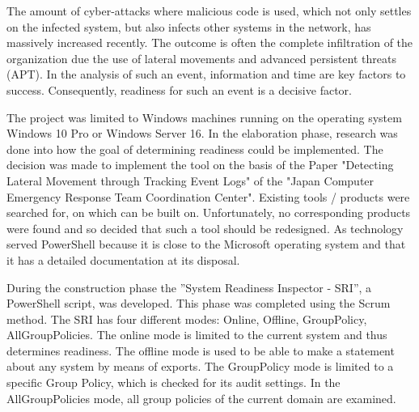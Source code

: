 
\thispagestyle{plain}
\renewcommand\section{\stdsection}
The amount of cyber-attacks where malicious code is used, which not only settles on the infected system, but also infects other systems in the network, has massively increased recently. The outcome is often the complete infiltration of the organization due the use of lateral movements and advanced persistent threats (APT). In the analysis of such an event, information and time are key factors to success. Consequently, readiness for such an event is a decisive factor.

The project was limited to Windows machines running on the operating system Windows 10 Pro or Windows Server 16. In the elaboration phase, research was done into how the goal of determining readiness could be implemented. The decision was made to implement the tool on the basis of the Paper "Detecting Lateral Movement through Tracking Event Logs" of the "Japan Computer Emergency Response Team Coordination Center". Existing tools / products were searched for, on which can be built on. Unfortunately, no corresponding products were found and so decided that such a tool should be redesigned. As technology served PowerShell because it is close to the Microsoft operating system and that it has a detailed documentation at its disposal.

During the construction phase the ''System Readiness Inspector - SRI'', a PowerShell script, was developed. This phase was completed using the Scrum method. The SRI has four different modes: Online, Offline, GroupPolicy, AllGroupPolicies. The online mode is limited to the current system and thus determines readiness. The offline mode is used to be able to make a statement about any system by means of exports. The GroupPolicy mode is limited to a specific Group Policy, which is checked for its audit settings. In the AllGroupPolicies mode, all group policies of the current domain are examined. 
\thispagestyle{plain}